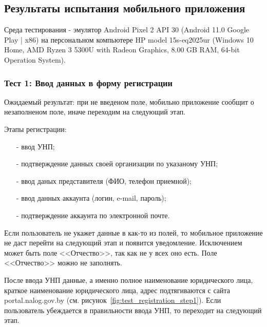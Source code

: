 




\subsection{Результаты испытания мобильного приложения}

Среда тестирования - эмулятор Android Pixel 2 API 30 (Android 11.0 Google Play | x86)
на персональном компьютере HP model 15s-eq2025ur (Windows 10 Home, AMD Ryzen 3 5300U with Radeon Graphics, 8.00 GB RAM, 64-bit Operation System).


\subsubsection*{Тест 1: Ввод данных в форму регистрации}

Ожидаемый результат: при не введеном поле, мобильно приложение сообщит о незаполненом поле, иначе переходим на следующий этап.

Этапы регистрации:
\begin{itemize}
    \item[-] ввод УНП;
    \item[-] подтверждение данных своей организации по указаному УНП;
    \item[-] ввод даных представителя (ФИО, телефон приемной);
    \item[-] ввод данных аккаунта (логин, e-mail, пароль);
    \item[-] подтверждение аккаунта по электронной почте.
\end{itemize}

Если пользователь не укажет данные в как-то из полей, то мобильное приложение не даст перейти на следующий этап
и появится уведомление.
Исключением может быть поле <<Отчество>>, так как не у всех оно есть.
Поле <<Отчество>> можно не заполнять.

После ввода УНП данные, а именно полное наименование юридического лица, краткое наименование юридического лица, адрес
подтягиваются с сайта portal.nalog.gov.by (см. рисунок~\ref{fig:test_registration_step1}).
Если пользователь убеждается в правильности ввода УНП, то переходит на следующий этап.

